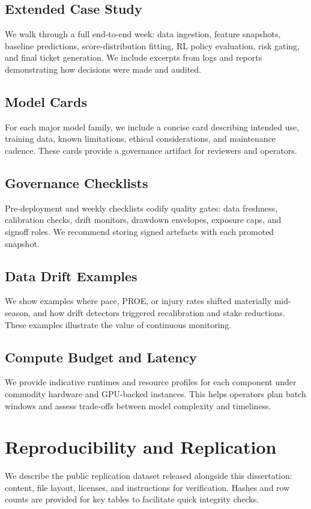 \documentclass[12pt]{report}  %
\numberwithin{equation}{section}
\theoremstyle{plain}
\theoremstyle{definition}
\theoremstyle{remark}
\begin{document}
\section{Extended Case Study}
We walk through a full end-to-end week: data ingestion, feature snapshots, baseline predictions, score-distribution fitting, RL policy evaluation, risk gating, and final ticket generation. We include excerpts from logs and reports demonstrating how decisions were made and audited.

\section{Model Cards}
For each major model family, we include a concise card describing intended use, training data, known limitations, ethical considerations, and maintenance cadence. These cards provide a governance artifact for reviewers and operators.

\section{Governance Checklists}
Pre-deployment and weekly checklists codify quality gates: data freshness, calibration checks, drift monitors, drawdown envelopes, exposure caps, and signoff roles. We recommend storing signed artefacts with each promoted snapshot.

\section{Data Drift Examples}
We show examples where pace, PROE, or injury rates shifted materially mid-season, and how drift detectors triggered recalibration and stake reductions. These examples illustrate the value of continuous monitoring.

\section{Compute Budget and Latency}
We provide indicative runtimes and resource profiles for each component under commodity hardware and GPU-backed instances. This helps operators plan batch windows and assess trade-offs between model complexity and timeliness.


\chapter{Reproducibility and Replication}
We describe the public replication dataset released alongside this dissertation: content, file layout, licenses, and instructions for verification. Hashes and row counts are provided for key tables to facilitate quick integrity checks.
\end{document}
